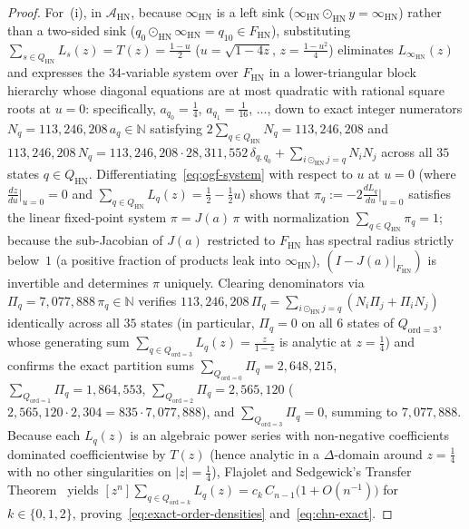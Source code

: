 \documentclass[11pt,reqno]{amsart}
\numberwithin{equation}{section}
\theoremstyle{plain}
\theoremstyle{definition}
\theoremstyle{remark}
\newcommand{\HN}{\mathrm{HN}}
\begin{document}
\begin{proof}
For~(i), in $\mathcal{A}_{\HN}$, because $\infty_{\HN}$ is a left sink ($\infty_{\HN} \odot_{\HN} y = \infty_{\HN}$) rather than a two-sided sink ($q_0 \odot_{\HN} \infty_{\HN} = q_{10} \in F_{\HN}$), substituting $\sum_{s \in Q_{\HN}} L_s(z) = T(z) = \frac{1 - u}{2}$ ($u = \sqrt{1 - 4z}$, $z = \frac{1 - u^2}{4}$) eliminates $L_{\infty_{\HN}}(z)$ and expresses the $34$-variable system over $F_{\HN}$ in a lower-triangular block hierarchy whose diagonal equations are at most quadratic with rational square roots at $u = 0$: specifically, $a_{q_0} = \frac{1}{4}$, $a_{q_1} = \frac{1}{16}$, $\dots$, down to exact integer numerators $N_q = 113{,}246{,}208\,a_q \in \mathbb{N}$ satisfying $2\sum_{q \in Q_{\HN}} N_q = 113{,}246{,}208$ and $113{,}246{,}208\,N_q = 113{,}246{,}208 \cdot 28{,}311{,}552\,\delta_{q, q_0} + \sum_{i \odot_{\HN} j = q} N_i N_j$ across all $35$ states $q \in Q_{\HN}$. Differentiating~\eqref{eq:ogf-system} with respect to $u$ at $u = 0$ (where $\frac{dz}{du}\big|_{u=0} = 0$ and $\sum_{q \in Q_{\HN}} L_q(z) = \frac{1}{2} - \frac{1}{2}u$) shows that $\pi_q := -2\frac{d L_q}{du}\big|_{u=0}$ satisfies the linear fixed-point system $\pi = J(a)\,\pi$ with normalization $\sum_{q \in Q_{\HN}} \pi_q = 1$; because the sub-Jacobian of $J(a)$ restricted to $F_{\HN}$ has spectral radius strictly below~$1$ (a positive fraction of products leak into $\infty_{\HN}$), $(I - J(a)|_{F_{\HN}})$ is invertible and determines $\pi$ uniquely. Clearing denominators via $\Pi_q = 7{,}077{,}888\,\pi_q \in \mathbb{N}$ verifies $113{,}246{,}208\,\Pi_q = \sum_{i \odot_{\HN} j = q} (N_i \Pi_j + \Pi_i N_j)$ identically across all $35$ states (in particular, $\Pi_q = 0$ on all $6$ states of $Q_{\mathrm{ord}=3}$, whose generating sum $\sum_{q \in Q_{\mathrm{ord}=3}} L_q(z) = \frac{z}{1 - z}$ is analytic at $z = \frac{1}{4}$) and confirms the exact partition sums $\sum_{Q_{\mathrm{ord}=0}} \Pi_q = 2{,}648{,}215$, $\sum_{Q_{\mathrm{ord}=1}} \Pi_q = 1{,}864{,}553$, $\sum_{Q_{\mathrm{ord}=2}} \Pi_q = 2{,}565{,}120$ ($2{,}565{,}120 \cdot 2{,}304 = 835 \cdot 7{,}077{,}888$), and $\sum_{Q_{\mathrm{ord}=3}} \Pi_q = 0$, summing to $7{,}077{,}888$. Because each $L_q(z)$ is an algebraic power series with non-negative coefficients dominated coefficientwise by $T(z)$ (hence analytic in a $\Delta$-domain around $z = \frac{1}{4}$ with no other singularities on $|z| = \frac{1}{4}$), Flajolet and Sedgewick's Transfer Theorem~\cite[Theorem~VI.1 and Section~VII.6]{FlajoletSedgewick2009} yields $[z^n] \sum_{q \in Q_{\mathrm{ord}=k}} L_q(z) = c_k\,C_{n-1}\bigl(1 + O(n^{-1})\bigr)$ for $k \in \{0, 1, 2\}$, proving~\eqref{eq:exact-order-densities} and~\eqref{eq:chn-exact}.


\end{proof}
\end{document}
